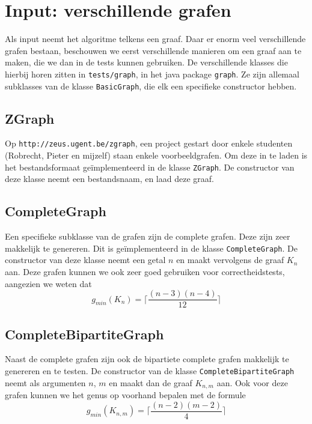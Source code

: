 \documentclass{article}
\begin{document}
\section{Input: verschillende grafen}
Als input neemt het algoritme telkens een graaf. Daar er enorm veel
verschillende grafen bestaan, beschouwen we eerst verschillende manieren om een
graaf aan te maken, die we dan in de tests kunnen gebruiken. De verschillende
klasses die hierbij horen zitten in \verb#tests/graph#, in het java package
\verb#graph#. Ze zijn allemaal subklasses van de klasse
\verb#BasicGraph#, die elk een specifieke constructor hebben.

\subsection{ZGraph}
Op \verb#http://zeus.ugent.be/zgraph#, een project gestart door enkele studenten
(Robrecht, Pieter en mijzelf) staan enkele voorbeeldgrafen. Om deze in te laden
is het bestandsformaat ge\"implementeerd in de klasse \verb#ZGraph#. De
constructor van deze klasse neemt een bestandsnaam, en laad deze graaf.

\subsection{CompleteGraph}
\label{complete-graph}
Een specifieke subklasse van de grafen zijn de complete grafen. Deze zijn zeer
makkelijk te genereren. Dit is ge\"implementeerd in de klasse
\verb#CompleteGraph#. De constructor van deze klasse neemt een getal $n$ en
maakt vervolgens de graaf $K_n$ aan. Deze grafen kunnen we ook zeer goed
gebruiken voor correctheidstests, aangezien we weten dat
\begin{equation*}
g_{min}(K_n) = \lceil \frac{(n - 3) (n - 4)}{12} \rceil
\end{equation*}

\subsection{CompleteBipartiteGraph}
\label{complete-bipartite-graph}
Naast de complete grafen zijn ook de bipartiete complete grafen makkelijk te
genereren en te testen. De constructor van de klasse
\verb#CompleteBipartiteGraph# neemt als argumenten $n$, $m$ en maakt dan de
graaf $K_{n,m}$ aan. Ook voor deze grafen kunnen we het genus op voorhand
bepalen met de formule
\begin{equation*}
g_{min}(K_{n,m}) = \lceil \frac{(n - 2) (m - 2)}{4} \rceil
\end{equation*}
\end{document}
